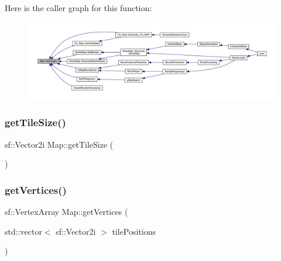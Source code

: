 Here is the caller graph for this function\+:
\nopagebreak
\begin{figure}[H]
\begin{center}
\leavevmode
\includegraphics[width=350pt]{dd/d11/class_map_a5181eaa96c1d125523a2b16d0643bbd5_icgraph}
\end{center}
\end{figure}
\mbox{\label{class_map_a5070fd388ce6f5ab71dd63475e28302c}} 
\subsubsection{\texorpdfstring{get\+Tile\+Size()}{getTileSize()}}
{\footnotesize\ttfamily sf\+::\+Vector2i Map\+::get\+Tile\+Size (\begin{DoxyParamCaption}{ }\end{DoxyParamCaption})}

\mbox{\label{class_map_ace55cfcebed9b27fd2329a16ce4ab352}} 
\subsubsection{\texorpdfstring{get\+Vertices()}{getVertices()}}
{\footnotesize\ttfamily sf\+::\+Vertex\+Array Map\+::get\+Vertices (\begin{DoxyParamCaption}\item[{std\+::vector$<$ sf\+::\+Vector2i $>$}]{tile\+Positions }\end{DoxyParamCaption})}

